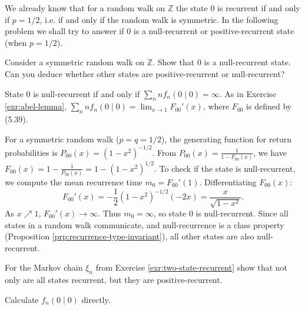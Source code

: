 We already know that for a random walk on $\mathbb{Z}$ the state 0 is recurrent if and only if $p = 1/2$, i.e. if and only if the random walk is symmetric. In the following problem we shall try to answer if 0 is a null-recurrent or positive-recurrent state (when $p = 1/2$).

\begin{Exercise}
\label{exr:symmetric-random-walk-null}
Consider a symmetric random walk on $\mathbb{Z}$. Show that 0 is a null-recurrent state. Can you deduce whether other states are positive-recurrent or null-recurrent?

\begin{hint}
State 0 is null-recurrent if and only if $\sum_n n f_n(0 \mid 0) = \infty$. As in Exercise \ref{exr:abel-lemma}, $\sum_n n f_n(0 \mid 0) = \lim_{x\to 1} F_{00}'(x)$, where $F_{00}$ is defined by (5.39).
\end{hint}
\end{Exercise}

\begin{Solution}
For a symmetric random walk ($p=q=1/2$), the generating function for return probabilities is $P_{00}(x) = (1-x^2)^{-1/2}$.
From $P_{00}(x) = \frac{1}{1 - F_{00}(x)}$, we have $F_{00}(x) = 1 - \frac{1}{P_{00}(x)} = 1 - (1-x^2)^{1/2}$.
To check if the state is null-recurrent, we compute the mean recurrence time $m_0 = F_{00}'(1)$.
Differentiating $F_{00}(x)$:
\[
F_{00}'(x) = -\frac{1}{2}(1-x^2)^{-1/2}(-2x) = \frac{x}{\sqrt{1-x^2}}.
\]
As $x \nearrow 1$, $F_{00}'(x) \to \infty$. Thus $m_0 = \infty$, so state 0 is null-recurrent.
Since all states in a random walk communicate, and null-recurrence is a class property (Proposition \ref{prp:recurrence-type-invariant}), all other states are also null-recurrent.
\end{Solution}

\begin{Exercise}
\label{exr:two-state-positive}
For the Markov chain $\xi_n$ from Exercise \ref{exr:two-state-recurrent} show that not only are all states recurrent, but they are positive-recurrent.

\begin{hint}
Calculate $f_n(0 \mid 0)$ directly.
\end{hint}
\end{Exercise}

